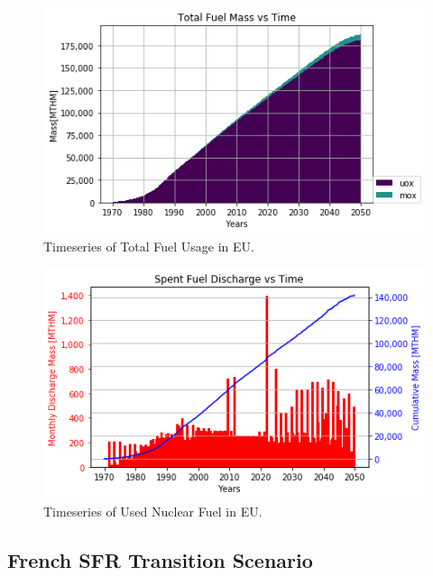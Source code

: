 	\begin{figure}[htbp!]
		\begin{center}
			\includegraphics[width=\columnwidth]{./images/eu_future/total_fuel.png}
		\end{center}
		\caption{Timeseries of Total Fuel Usage in \gls{EU}.}
		\label{fig:eu_fuel}
	\end{figure}
	
	\begin{figure}[htbp!]
		\begin{center}
			\includegraphics[width=\columnwidth]{./images/eu_future/snf_discharge.png}
		\end{center}
		\caption{Timeseries of Used Nuclear Fuel in \gls{EU}.}
		\label{fig:eu_snf}
	\end{figure}
	\FloatBarrier


	\subsection{French \gls{SFR} Transition Scenario}
	
